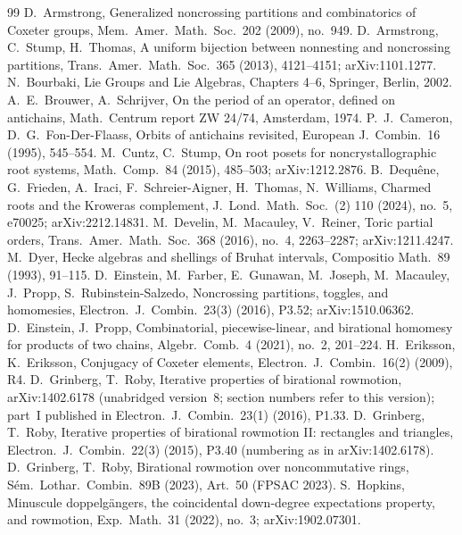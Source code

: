 \documentclass[11pt]{amsart}
\theoremstyle{definition}
\begin{document}
\begin{thebibliography}{99}
 D.~Armstrong, Generalized noncrossing partitions and combinatorics of Coxeter groups, Mem.\ Amer.\ Math.\ Soc.\ 202 (2009), no.~949.
 D.~Armstrong, C.~Stump, H.~Thomas, A uniform bijection between nonnesting and noncrossing partitions, Trans.\ Amer.\ Math.\ Soc.\ 365 (2013), 4121--4151; arXiv:1101.1277.
 N.~Bourbaki, Lie Groups and Lie Algebras, Chapters 4--6, Springer, Berlin, 2002.
 A.~E.~Brouwer, A.~Schrijver, On the period of an operator, defined on antichains, Math.\ Centrum report ZW 24/74, Amsterdam, 1974.
 P.~J.~Cameron, D.~G.~Fon-Der-Flaass, Orbits of antichains revisited, European J.\ Combin.\ 16 (1995), 545--554.
 M.~Cuntz, C.~Stump, On root posets for noncrystallographic root systems, Math.\ Comp.\ 84 (2015), 485--503; arXiv:1212.2876.
 B.~Dequ\^ene, G.~Frieden, A.~Iraci, F.~Schreier-Aigner, H.~Thomas, N.~Williams, Charmed roots and the Kroweras complement, J.\ Lond.\ Math.\ Soc.\ (2) 110 (2024), no.~5, e70025; arXiv:2212.14831.
 M.~Develin, M.~Macauley, V.~Reiner, Toric partial orders, Trans.\ Amer.\ Math.\ Soc.\ 368 (2016), no.~4, 2263--2287; arXiv:1211.4247.
 M.~Dyer, Hecke algebras and shellings of Bruhat intervals, Compositio Math.\ 89 (1993), 91--115.
 D.~Einstein, M.~Farber, E.~Gunawan, M.~Joseph, M.~Macauley, J.~Propp, S.~Rubinstein-Salzedo, Noncrossing partitions, toggles, and homomesies, Electron.\ J.\ Combin.\ 23(3) (2016), P3.52; arXiv:1510.06362.
 D.~Einstein, J.~Propp, Combinatorial, piecewise-linear, and birational homomesy for products of two chains, Algebr.\ Comb.\ 4 (2021), no.~2, 201--224.
 H.~Eriksson, K.~Eriksson, Conjugacy of Coxeter elements, Electron.\ J.\ Combin.\ 16(2) (2009), R4.
 D.~Grinberg, T.~Roby, Iterative properties of birational rowmotion, arXiv:1402.6178 (unabridged version~8; section numbers refer to this version); part~I published in Electron.\ J.\ Combin.\ 23(1) (2016), P1.33.
 D.~Grinberg, T.~Roby, Iterative properties of birational rowmotion II: rectangles and triangles, Electron.\ J.\ Combin.\ 22(3) (2015), P3.40 (numbering as in arXiv:1402.6178).
 D.~Grinberg, T.~Roby, Birational rowmotion over noncommutative rings, S\'em.\ Lothar.\ Combin.\ 89B (2023), Art.~50 (FPSAC 2023).
 S.~Hopkins, Minuscule doppelg\"angers, the coincidental down-degree expectations property, and rowmotion, Exp.\ Math.\ 31 (2022), no.~3; arXiv:1902.07301.

\end{thebibliography}
\end{document}
